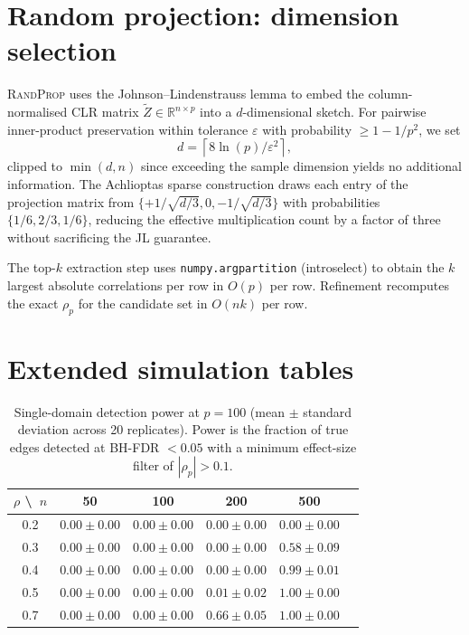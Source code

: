 \documentclass[11pt]{article}
\newcommand{\randprop}{\textsc{RandProp}\xspace}
\newcommand{\R}{\mathbb{R}}
\theoremstyle{plain}
\begin{document}
\section{Random projection: dimension selection}
\label{sec:randprop}

\randprop uses the Johnson--Lindenstrauss lemma
\citep{JohnsonLindenstrauss1984,Achlioptas2003} to embed the
column-normalised CLR matrix $\tilde Z \in \R^{n \times p}$ into a
$d$-dimensional sketch. For pairwise inner-product preservation within
tolerance $\varepsilon$ with probability $\geq 1 - 1/p^2$, we set
\begin{equation}
d = \left\lceil 8 \ln(p) / \varepsilon^2 \right\rceil,
\end{equation}
clipped to $\min(d, n)$ since exceeding the sample dimension yields no
additional information. The Achlioptas sparse construction draws each entry
of the projection matrix from $\{+1/\sqrt{d/3}, 0, -1/\sqrt{d/3}\}$ with
probabilities $\{1/6, 2/3, 1/6\}$, reducing the effective multiplication
count by a factor of three without sacrificing the JL guarantee.

The top-$k$ extraction step uses \texttt{numpy.argpartition} (introselect)
to obtain the $k$ largest absolute correlations per row in $O(p)$ per row.
Refinement recomputes the exact $\rho_p$ for the candidate set in
$O(nk)$ per row.

\section{Extended simulation tables}
\label{sec:tables}

\begin{table}[h]
\centering
\caption{Single-domain detection power at $p = 100$
(mean $\pm$ standard deviation across 20 replicates). Power is the fraction
of true edges detected at BH-FDR $< 0.05$ with a minimum effect-size filter
of $|\rho_p| > 0.1$.}
\label{tab:power-p100}
\begin{tabular}{@{}cccccc@{}}
\toprule
$\rho$ \textbackslash\ $n$ & 50 & 100 & 200 & 500 \\
\midrule
0.2 & $0.00\pm0.00$ & $0.00\pm0.00$ & $0.00\pm0.00$ & $0.00\pm0.00$ \\
0.3 & $0.00\pm0.00$ & $0.00\pm0.00$ & $0.00\pm0.00$ & $0.58\pm0.09$ \\
0.4 & $0.00\pm0.00$ & $0.00\pm0.00$ & $0.00\pm0.00$ & $0.99\pm0.01$ \\
0.5 & $0.00\pm0.00$ & $0.00\pm0.00$ & $0.01\pm0.02$ & $1.00\pm0.00$ \\
0.7 & $0.00\pm0.00$ & $0.00\pm0.00$ & $0.66\pm0.05$ & $1.00\pm0.00$ \\
\bottomrule
\end{tabular}
\end{table}
\end{document}
